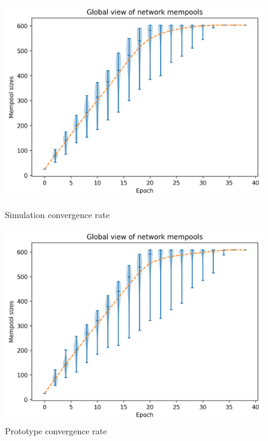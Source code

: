 \documentclass[mscthesis]{usiinfthesis}
\begin{document}
\begin{figure}[H]
   \begin{minipage}{0.49\textwidth}
     \centering
     \includegraphics[width=\linewidth]{images/5/5-conv.png}
  	\caption{Simulation convergence rate}
  	\label{fig:sim-one-duplicates}
   \end{minipage}\hfill
   \begin{minipage}{0.49\textwidth}
     \centering
     \includegraphics[width=\linewidth]{images/6/6-conv.png}
       \caption{Prototype convergence rate}
 		\label{fig:sim-two-duplicates}
   \end{minipage}
\end{figure}
\end{document}
